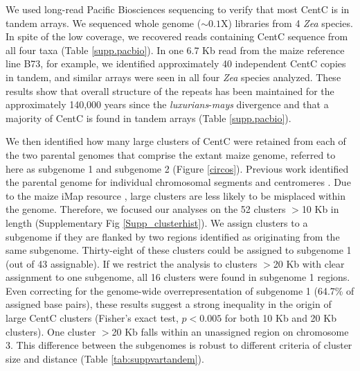 We used long-read Pacific Biosciences sequencing to verify that most CentC is in tandem arrays. 
We sequenced whole genome ($\sim 0.1$X) libraries from 4 \emph{Zea} species.  
In spite of the low coverage, we recovered reads containing CentC sequence from all four taxa (Table \ref{supp.pacbio}).  
In one 6.7 Kb read from the maize reference line B73, for example, we identified approximately 40 independent CentC copies in tandem, and similar arrays were seen in all four \emph{Zea} species analyzed.  
These results show that overall structure of the repeats has been maintained for the approximately 140,000 years since the \emph{luxurians}-\emph{mays} divergence \citep{Hanson1996,  Ross-Ibarra2009} and that a majority of CentC is found in tandem arrays (Table \ref{supp.pacbio}).

We then identified how many large clusters of CentC were retained from each of the two parental genomes that comprise the extant maize genome, referred to here as subgenome 1 and subgenome 2 (Figure \ref{circos}).  
Previous work identified the parental genome for individual chromosomal segments \citep{Schnable2011} and centromeres \citep{Wang2012}.  
Due to the maize iMap resource \citep{zhou2009single}, large clusters are less likely to be misplaced within the genome.
Therefore, we focused our analyses on the 52 clusters $>$10 Kb in length (Supplementary Fig \ref{Supp_clusterhist}).
We assign clusters to a subgenome if they are flanked by two regions identified as originating from the same  subgenome.  
Thirty-eight of these clusters could be assigned to subgenome 1 (out of 43 assignable).
If we restrict the analysis to clusters  $>$20 Kb with clear assignment to one subgenome, all 16 clusters were found in subgenome 1 regions.  
Even correcting for the genome-wide overrepresentation of subgenome 1 (64.7\% of assigned base pairs), these results suggest a strong inequality in the origin of large CentC clusters (Fisher's exact test, $p<0.005$ for both 10 Kb and 20 Kb clusters).
One cluster $>$20 Kb falls within an unassigned region on chromosome 3.
This difference between the subgenomes is robust to different criteria of cluster size and distance (Table \ref{tab:suppvartandem}).

